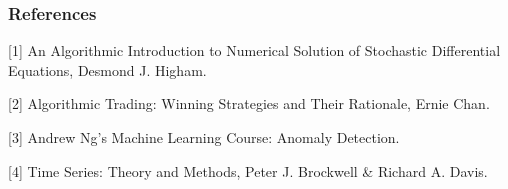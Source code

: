 \documentclass[11pt]{beamer}
\begin{document}
\begin{frame}
\frametitle{References}
[1] An Algorithmic Introduction to Numerical Solution of Stochastic Differential Equations, Desmond J. Higham.

[2] Algorithmic Trading: Winning Strategies and Their Rationale, Ernie Chan.

[3] Andrew Ng's Machine Learning Course: Anomaly Detection.

[4] Time Series: Theory and Methods, Peter J. Brockwell \& Richard A. Davis.

\end{frame}
\end{document}
